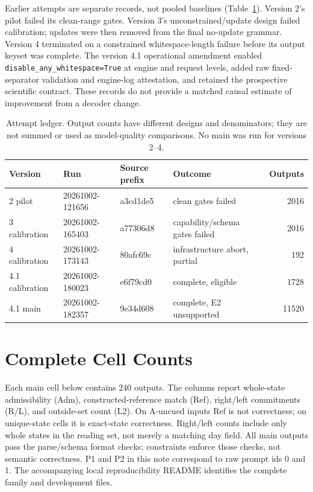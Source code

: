\documentclass[11pt]{article}
\begin{document}
Earlier attempts are separate records, not pooled baselines (Table~\ref{tab:versions}). Version 2's pilot failed its clean-range gates. Version 3's unconstrained/update design failed calibration; updates were then removed from the final no-update grammar. Version 4 terminated on a constrained whitespace-length failure before its output keyset was complete. The version 4.1 operational amendment enabled \texttt{disable\_any\_whitespace=True} at engine and request levels, added raw fixed-separator validation and engine-log attestation, and retained the prospective scientific contract. These records do not provide a matched causal estimate of improvement from a decoder change.

\begin{table}[ht]\centering\small
\begin{tabular}{llllr}\toprule
Version & Run & Source prefix & Outcome & Outputs\\\midrule
2 pilot &20261002-121656&a3cd1de5&clean gates failed&2016\\
3 calibration &20261002-165403&a77306d8&capability/schema gates failed&2016\\
4 calibration &20261002-173143&80afc69c&infrastructure abort, partial&192\\
4.1 calibration &20261002-180023&e6f79cd0&complete, eligible&1728\\
4.1 main &20261002-182357&9e34d608&complete, E2 unsupported&11520\\\bottomrule
\end{tabular}
\caption{Attempt ledger. Output counts have different designs and denominators; they are not summed or used as model-quality comparisons. No main was run for versions 2--4.}\label{tab:versions}
\end{table}

\section{Complete Cell Counts}
Each main cell below contains 240 outputs. The columns report whole-state admissibility (Adm), constructed-reference match (Ref), right/left commitments (R/L), and outside-set count (L2). On A-uncued inputs Ref is not correctness; on unique-state cells it is exact-state correctness. Right/left counts include only whole states in the reading set, not merely a matching day field. All main outputs pass the parse/schema format checks; constraints enforce those checks, not semantic correctness. P1 and P2 in this note correspond to raw prompt ids 0 and 1. The accompanying local reproducibility README identifies the complete family and development files.
\end{document}
